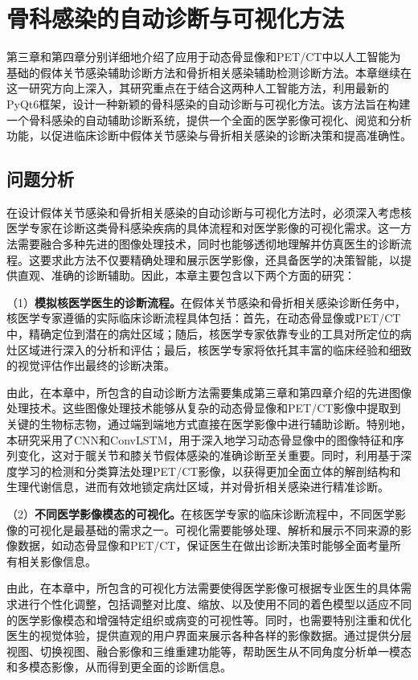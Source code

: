\chapter{骨科感染的自动诊断与可视化方法}

第三章和第四章分别详细地介绍了应用于动态骨显像和PET/CT中以人工智能为基础的假体关节感染辅助诊断方法和骨折相关感染辅助检测诊断方法。本章继续在这一研究方向上深入，其研究重点在于结合这两种人工智能方法，利用最新的PyQt6框架，设计一种新颖的骨科感染的自动诊断与可视化方法。该方法旨在构建一个骨科感染的自动辅助诊断系统，提供一个全面的医学影像可视化、阅览和分析功能，以促进临床诊断中假体关节感染与骨折相关感染的诊断决策和提高准确性。

\section{问题分析}

在设计假体关节感染和骨折相关感染的自动诊断与可视化方法时，必须深入考虑核医学专家在诊断这类骨科感染疾病的具体流程和对医学影像的可视化需求。这一方法需要融合多种先进的图像处理技术，同时也能够透彻地理解并仿真医生的诊断流程。这要求此方法不仅要精确处理和展示医学影像，还具备医学的决策智能，以提供直观、准确的诊断辅助。因此，本章主要包含以下两个方面的研究：

（1）\textbf{模拟核医学医生的诊断流程。}在假体关节感染和骨折相关感染诊断任务中，核医学专家遵循的实际临床诊断流程具体包括：首先，在动态骨显像或PET/CT中，精确定位到潜在的病灶区域；随后，核医学专家依靠专业的工具对所定位的病灶区域进行深入的分析和评估；最后，核医学专家将依托其丰富的临床经验和细致的视觉评估作出最终的诊断决策。

由此，在本章中，所包含的自动诊断方法需要集成第三章和第四章介绍的先进图像处理技术。这些图像处理技术能够从复杂的动态骨显像和PET/CT影像中提取到关键的生物标志物，通过端到端地方式直接在医学影像中进行辅助诊断。特别地，本研究采用了CNN和ConvLSTM，用于深入地学习动态骨显像中的图像特征和序列变化，这对于髋关节和膝关节假体感染的准确诊断至关重要。同时，利用基于深度学习的检测和分类算法处理PET/CT影像，以获得更加全面立体的解剖结构和生理代谢信息，进而有效地锁定病灶区域，并对骨折相关感染进行精准诊断。

（2）\textbf{不同医学影像模态的可视化。}在核医学专家的临床诊断流程中，不同医学影像的可视化是最基础的需求之一。可视化需要能够处理、解析和展示不同来源的影像数据，如动态骨显像和PET/CT，保证医生在做出诊断决策时能够全面考量所有相关影像信息。

由此，在本章中，所包含的可视化方法需要使得医学影像可根据专业医生的具体需求进行个性化调整，包括调整对比度、缩放、以及使用不同的着色模型以适应不同的医学影像模态和增强特定组织或病变的可视性等。同时，也需要特别注重和优化医生的视觉体验，提供直观的用户界面来展示各种各样的影像数据。通过提供分层视图、切换视图、融合影像和三维重建功能等，帮助医生从不同角度分析单一模态和多模态影像，从而得到更全面的诊断信息。

